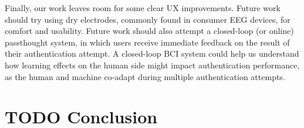 \documentclass[letterpaper,twocolumn,10pt]{article}
\begin{document}
Finally, our work leaves room for some clear UX improvements.
Future work should try using dry electrodes, commonly found in consumer EEG devices, for comfort and usability.
Future work should also attempt a closed-loop (or online) passthought system, in which users receive immediate feedback on the result of their authentication attempt. A closed-loop BCI system could help us understand how learning effects
on the human side might impact authentication performance, as the human and machine co-adapt during multiple authentication attempts.

\section{TODO Conclusion}
\end{document}
